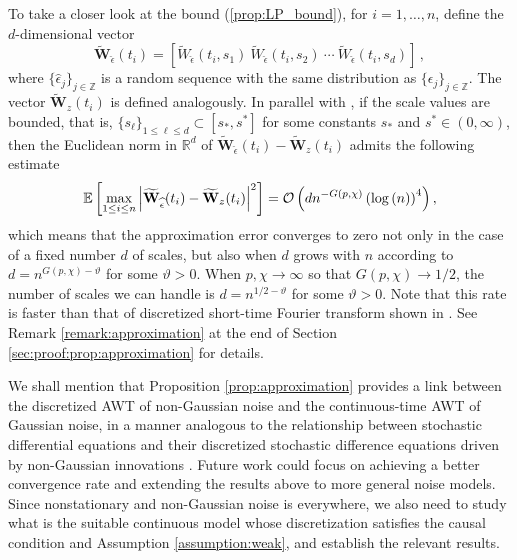\documentclass{amsart}
\begin{document}
To take a closer look at the bound (\ref{prop:LP_bound}), for $i=1,\ldots,n$, define the $d$-dimensional vector
$$\widetilde{\mathbf{W}}_{\widehat{\epsilon}}(t_{i})= \left[\widetilde{W}_{\widehat{\epsilon}}(t_{i},s_{1})\  \widetilde{W}_{\widehat{\epsilon}}(t_{i},s_{2})\ \cdots\
\widetilde{W}_{\widehat{\epsilon}}(t_{i},s_{d})\right]\,,
$$
where $\{\widehat{\epsilon}_{j}\}_{j\in \mathbb{Z}}$ is a random sequence with the same distribution as $\{\epsilon_{j}\}_{j\in \mathbb{Z}}$.
The vector $\widetilde{\mathbf{W}}_{z}(t_{i})$ is defined analogously.
In parallel with \cite[Theorem~3.2]{wu2025uncertainty}, if
the scale values are bounded, that is, $\{s_{\ell}\}_{1\leq \ell\leq d}\subset [s_{*},s^{*}]$ for some constants  $s_{*}$ and $s^{*}\in(0,\infty)$,
then the Euclidean norm in $\mathbb{R}^{d}$ of $\widetilde{\mathbf{W}}_{\widehat{\epsilon}}(t_{i})-\widetilde{\mathbf{W}}_{z}(t_{i})$
admits the following estimate
\begin{align}\notag
\mathbb{E}\left[\underset{1\leq i\leq n}{\max}\left|\widetilde{\mathbf{W}}_{\widehat{\epsilon}}(t_{i})-\widetilde{\mathbf{W}}_{z}(t_{i})\right|^{2}\right]
=\mathcal{O}\left(dn^{-G(p,\chi)}\left(\log\left(n\right)\right)^{4}\right),
\end{align}
which means that the approximation error converges to zero not only in the case of a fixed number $d$ of scales,
but also when
$d$ grows with
$n$ according to $d=n^{G(p,\chi)-\vartheta}$ for some $\vartheta>0$.
When $p,\chi\to \infty$ so that $G(p,\chi)\to 1/2$, the number of scales we can handle is $d=n^{1/2-\vartheta}$ for some $\vartheta>0$. Note that this rate is faster than that of discretized short-time Fourier transform shown in \cite[Theorem~3.2]{wu2025uncertainty}.
See Remark \ref{remark:approximation} at the end of Section \ref{sec:proof:prop:approximation} for details.



%
We shall mention that Proposition \ref{prop:approximation} provides a link between the discretized AWT of non-Gaussian noise and the continuous-time AWT of Gaussian noise, in a manner analogous to the relationship between stochastic differential equations and their discretized stochastic difference equations driven by non-Gaussian innovations \cite{Unser2014I,Unser2014II}.
%
Future work could focus on achieving a better convergence rate and extending the results above to more general noise models. Since nonstationary and non-Gaussian noise is everywhere, we also need to study what is the suitable continuous model whose discretization satisfies the causal condition and Assumption \ref{assumption:weak}, and establish the relevant results.
\end{document}
